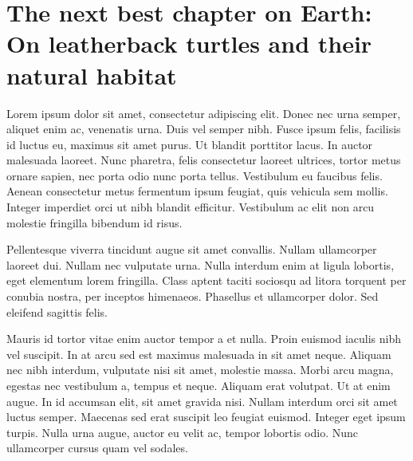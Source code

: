 
\renewcommand{\chapterauthor}{Harry Glove}
\renewcommand{\shortchaptertitle}{The next best chapter on Earth}
\chapter{The next best chapter on Earth: On leatherback turtles and their
  natural habitat}
\label{ch:fun}

\cftaddtitleline{toc}{section}{\emph{\chapterauthor}}{}

Lorem ipsum dolor sit amet, consectetur adipiscing elit. Donec nec urna semper,
aliquet enim ac, venenatis urna. Duis vel semper nibh. Fusce ipsum felis,
facilisis id luctus eu, maximus sit amet purus. Ut blandit porttitor lacus. In
auctor malesuada laoreet. Nunc pharetra, felis consectetur laoreet ultrices,
tortor metus ornare sapien, nec porta odio nunc porta tellus. Vestibulum eu
faucibus felis. Aenean consectetur metus fermentum ipsum feugiat, quis vehicula
sem mollis. Integer imperdiet orci ut nibh blandit efficitur. Vestibulum ac elit
non arcu molestie fringilla bibendum id risus.

Pellentesque viverra tincidunt augue sit amet convallis. Nullam ullamcorper
laoreet dui. Nullam nec vulputate urna. Nulla interdum enim at ligula lobortis,
eget elementum lorem fringilla. Class aptent taciti sociosqu ad litora torquent
per conubia nostra, per inceptos himenaeos. Phasellus et ullamcorper dolor. Sed
eleifend sagittis felis.

Mauris id tortor vitae enim auctor tempor a et nulla. Proin euismod iaculis nibh
vel suscipit. In at arcu sed est maximus malesuada in sit amet neque. Aliquam
nec nibh interdum, vulputate nisi sit amet, molestie massa. Morbi arcu magna,
egestas nec vestibulum a, tempus et neque. Aliquam erat volutpat. Ut at enim
augue. In id accumsan elit, sit amet gravida nisi. Nullam interdum orci sit amet
luctus semper. Maecenas sed erat suscipit leo feugiat euismod. Integer eget
ipsum turpis. Nulla urna augue, auctor eu velit ac, tempor lobortis odio. Nunc
ullamcorper cursus quam vel sodales.

